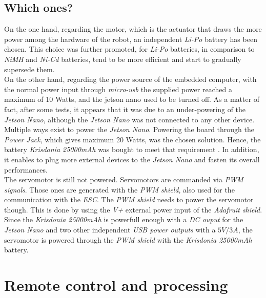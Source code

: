 		\subsection{Which ones?}
		On the one hand, regarding the motor, which is the actuator that 
		draws the more power among the hardware of the robot, an independent 
		\textit{Li-Po} battery has been chosen. This choice
		was further promoted, for \textit{Li-Po} batteries, in 
		comparison to \textit{NiMH} and \textit{Ni-Cd} batteries, 
		tend to be more efficient and start to gradually 
		supersede them.
		\\\indent On the other hand, regarding the power source of the embedded computer, with 
		the normal power input through \textit{micro-usb} the supplied power
		reached a maximum of 10 Watts, and the jetson nano used to be turned off. As a matter of fact,
		after some tests, it appears that it was due to an under-powering of the 
		\textit{Jetson Nano}, although the \textit{Jetson Nano} was not connected
		to any other device. Multiple ways exist to power the \textit{Jetson Nano}.
		Powering the board through the \textit{Power Jack}, which gives maximum 20 Watts, 
		was the chosen solution. Hence, the battery \textit{Krisdonia 25000mAh} was bought to meet that 
		requirement \cite{nanopowerbank}. In addition, it enables to plug more external devices to the \textit{Jetson Nano}
		and fasten its overall performances.
		\\\indent The servomotor is still not powered. Servomotors are commanded
		via \textit{PWM signals}. Those ones are generated with the \textit{PWM shield}, also 
		used for the communication with the \textit{ESC}. The \textit{PWM shield} needs to power the 
		servomotor though. This is done by using the \textit{V+} external power input of
		the \textit{Adafruit shield}. Since the \textit{Krisdonia 25000mAh} is powerfull 
		enough with a \textit{DC ouput} for the \textit{Jetson Nano} and two other independent
		\textit{USB power outputs} with a $5V/3A$, the servomotor is powered through the \textit{PWM shield}
		with the \textit{Krisdonia 25000mAh} battery.
		\cite{jetsonhacksmorepower,nanoguide,elinuxdoc}

	\section{Remote control and processing}
		
